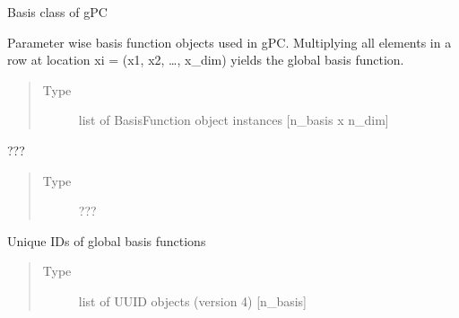 \documentclass[letterpaper,10pt,english,openany,oneside]{sphinxmanual}
\begin{document}
\begin{fulllineitems}
\label{\detokenize{pygpc:pygpc.Basis.Basis}}
Basis class of gPC

\begin{fulllineitems}
\label{\detokenize{pygpc:pygpc.Basis.Basis.b}}
Parameter wise basis function objects used in gPC.
Multiplying all elements in a row at location xi = (x1, x2, …, x\_dim) yields the global basis function.
\begin{quote}\begin{description}
\item[{Type}] \leavevmode
list of BasisFunction object instances {[}n\_basis x n\_dim{]}

\end{description}\end{quote}

\end{fulllineitems}


\begin{fulllineitems}
\label{\detokenize{pygpc:pygpc.Basis.Basis.b_gpu}}
???
\begin{quote}\begin{description}
\item[{Type}] \leavevmode
???

\end{description}\end{quote}

\end{fulllineitems}


\begin{fulllineitems}
\label{\detokenize{pygpc:pygpc.Basis.Basis.b_id}}
Unique IDs of global basis functions
\begin{quote}\begin{description}
\item[{Type}] \leavevmode
list of UUID objects (version 4) {[}n\_basis{]}


\end{description}
\end{quote}
\end{fulllineitems}
\end{fulllineitems}
\end{document}
